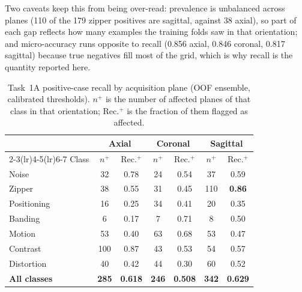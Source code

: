 \documentclass[runningheads]{llncs}
\begin{document}
Two caveats keep this from being over-read: prevalence is unbalanced across planes
(110 of the 179 zipper positives are sagittal, against 38 axial), so part of each gap
reflects how many examples the training folds saw in that orientation; and
micro-accuracy runs opposite to recall (0.856 axial, 0.846 coronal, 0.817 sagittal)
because true negatives fill most of the grid, which is why recall is the quantity
reported here.

\begin{table}[!htbp]
\caption{Task~1A positive-case recall by acquisition plane (OOF ensemble, calibrated
thresholds). $n^{+}$ is the number of affected planes of that class in that
orientation; Rec.$^{+}$ is the fraction of them flagged as affected.}
\label{tab:plane}
\centering
\setlength{\tabcolsep}{5pt}
\footnotesize
\begin{tabular}{lcccccc}
\toprule
& \multicolumn{2}{c}{Axial} & \multicolumn{2}{c}{Coronal} & \multicolumn{2}{c}{Sagittal} \\
\cmidrule(lr){2-3}\cmidrule(lr){4-5}\cmidrule(lr){6-7}
Class & $n^{+}$ & Rec.$^{+}$ & $n^{+}$ & Rec.$^{+}$ & $n^{+}$ & Rec.$^{+}$ \\
\midrule
Noise       &  32 & 0.78 &  24 & 0.54 &  37 & 0.59 \\
Zipper      &  38 & 0.55 &  31 & 0.45 & 110 & \textbf{0.86} \\
Positioning &  16 & 0.25 &  34 & 0.41 &  20 & 0.35 \\
Banding     &   6 & 0.17 &   7 & 0.71 &   8 & 0.50 \\
Motion      &  53 & 0.40 &  63 & 0.68 &  53 & 0.47 \\
Contrast    & 100 & 0.87 &  43 & 0.53 &  54 & 0.57 \\
Distortion  &  40 & 0.42 &  44 & 0.30 &  60 & 0.52 \\
\midrule
\textbf{All classes} & \textbf{285} & \textbf{0.618} & \textbf{246} & \textbf{0.508}
  & \textbf{342} & \textbf{0.629} \\
\bottomrule
\end{tabular}
\end{table}
\end{document}
